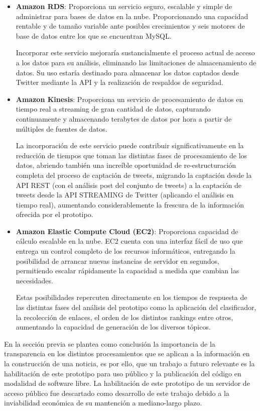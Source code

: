 	\begin{itemize}
		\item \textbf{Amazon RDS}: Proporciona un servicio seguro, escalable y simple de administrar para bases de datos en la nube. Proporcionando una capacidad rentable y de tamaño variable ante posibles crecimientos y seis motores de base de datos entre los que se encuentran MySQL.
		
		Incorporar este servicio mejoraría sustancialmente el proceso actual de acceso a los datos para su análisis, eliminando las limitaciones de almacenamiento de datos. Su uso estaría destinado para almacenar los datos captados desde Twitter mediante la API y la realización de respaldos de seguridad.
		
		\item \textbf{Amazon Kinesis}: Proporciona un servicio de procesamiento de datos en tiempo real a streaming de gran cantidad de datos, capturando continuamente y almacenando terabytes de datos por hora a partir de múltiples de fuentes de datos.
		
		La incorporación de este servicio puede contribuir significativamente en la reducción de tiempos que toman las distintas fases de procesamiento de los datos, abriendo también una increíble oportunidad de  re-estructuración completa del proceso de captación de tweets, migrando  la captación desde la API REST (con el análisis post del conjunto de tweets) a la captación de tweets desde la API STREAMING de Twitter (aplicando el análisis en tiempo real), aumentando considerablemente la frescura de la información ofrecida por el prototipo.
		
		\item \textbf{Amazon Elastic Compute Cloud (EC2)}: Proporciona capacidad de cálculo escalable en la nube. EC2 cuenta con una interfaz fácil de uso que entrega un control completo de los recursos informáticos, entregando la posibilidad de arrancar nuevas instancias de servidor en segundos, permitiendo escalar rápidamente la capacidad a medida que cambian las necesidades.
		
		Estas posibilidades repercuten directamente en los tiempos de respuesta de las distintas fases del análisis del prototipo como la aplicación del clasificador, la recolección de enlaces, el orden de los distintos rankings entre otros, aumentando la capacidad de generación de los diversos tópicos.
		
	\end{itemize}
	
En la sección previa se plantea como conclusión la importancia de la transparencia en los distintos procesamientos que se aplican a la información en la construcción de una noticia, es por ello, que un trabajo a futuro relevante es la habilitación de este prototipo para uso público y la publicación del código en modalidad de software libre. La habilitación de este prototipo de un servidor de acceso público fue descartado como desarrollo de este trabajo debido a la inviabilidad económica de su mantención a mediano-largo plazo.
	
